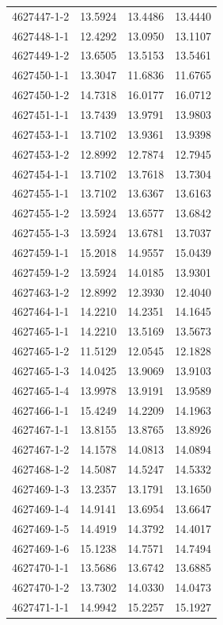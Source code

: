 \begin{longtable}{lrrr}
4627447-1-2 & 13.5924 & 13.4486 & 13.4440 \\
4627448-1-1 & 12.4292 & 13.0950 & 13.1107 \\
4627449-1-2 & 13.6505 & 13.5153 & 13.5461 \\
4627450-1-1 & 13.3047 & 11.6836 & 11.6765 \\
4627450-1-2 & 14.7318 & 16.0177 & 16.0712 \\
4627451-1-1 & 13.7439 & 13.9791 & 13.9803 \\
4627453-1-1 & 13.7102 & 13.9361 & 13.9398 \\
4627453-1-2 & 12.8992 & 12.7874 & 12.7945 \\
4627454-1-1 & 13.7102 & 13.7618 & 13.7304 \\
4627455-1-1 & 13.7102 & 13.6367 & 13.6163 \\
4627455-1-2 & 13.5924 & 13.6577 & 13.6842 \\
4627455-1-3 & 13.5924 & 13.6781 & 13.7037 \\
4627459-1-1 & 15.2018 & 14.9557 & 15.0439 \\
4627459-1-2 & 13.5924 & 14.0185 & 13.9301 \\
4627463-1-2 & 12.8992 & 12.3930 & 12.4040 \\
4627464-1-1 & 14.2210 & 14.2351 & 14.1645 \\
4627465-1-1 & 14.2210 & 13.5169 & 13.5673 \\
4627465-1-2 & 11.5129 & 12.0545 & 12.1828 \\
4627465-1-3 & 14.0425 & 13.9069 & 13.9103 \\
4627465-1-4 & 13.9978 & 13.9191 & 13.9589 \\
4627466-1-1 & 15.4249 & 14.2209 & 14.1963 \\
4627467-1-1 & 13.8155 & 13.8765 & 13.8926 \\
4627467-1-2 & 14.1578 & 14.0813 & 14.0894 \\
4627468-1-2 & 14.5087 & 14.5247 & 14.5332 \\
4627469-1-3 & 13.2357 & 13.1791 & 13.1650 \\
4627469-1-4 & 14.9141 & 13.6954 & 13.6647 \\
4627469-1-5 & 14.4919 & 14.3792 & 14.4017 \\
4627469-1-6 & 15.1238 & 14.7571 & 14.7494 \\
4627470-1-1 & 13.5686 & 13.6742 & 13.6885 \\
4627470-1-2 & 13.7302 & 14.0330 & 14.0473 \\
4627471-1-1 & 14.9942 & 15.2257 & 15.1927 \\

\end{longtable}
